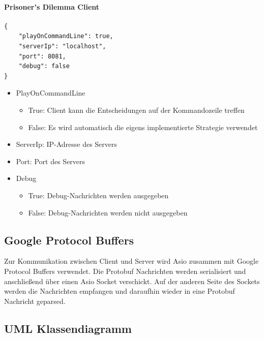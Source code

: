 \documentclass[12pt, letterpaper]{article}
\begin{document}
\paragraph{Prisoner's Dilemma Client}

\begin{verbatim}
{
    "playOnCommandLine": true,
    "serverIp": "localhost",
    "port": 8081,
    "debug": false
}
\end{verbatim}

\begin{itemize}
	\item PlayOnCommandLine
	\begin{itemize}
		\item True: Client kann die Entscheidungen auf der Kommandozeile treffen
		\item False: Es wird automatisch die eigens implementierte Strategie verwendet
	\end{itemize}
	\item ServerIp: IP-Adresse des Servers
	\item Port: Port des Servers
	\item Debug
	\begin{itemize}
		\item True: Debug-Nachrichten werden ausgegeben
		\item False: Debug-Nachrichten werden nicht ausgegeben
	\end{itemize}
\end{itemize}

\subsection{Google Protocol Buffers}
Zur Kommunikation zwischen Client und Server wird Asio zusammen mit Google Protocol Buffers verwendet. Die Protobuf Nachrichten werden serialisiert und anschließend über einen Asio Socket verschickt. Auf der anderen Seite des Sockets werden die Nachrichten empfangen und daraufhin wieder in eine Protobuf Nachricht geparsed.

\subsection{UML Klassendiagramm}
\end{document}
